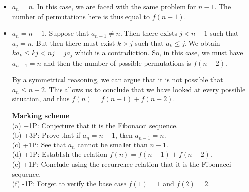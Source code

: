 \begin{itemize}
    \item $a_n = n$. In this case, we are faced with the same problem for $n-1$. The number of permutations here is thus equal to $f(n-1)$.
    \item $a_n = n-1$. Suppose that $a_{n-1} \neq n$. Then there exists $j<n-1$ such that $a_j = n$. But then there must exist $k > j$ such that $a_k \leq j$. We obtain $ka_k \leq kj < nj = ja_j$ which is a contradiction. So, in this case, we must have $a_{n-1} = n$ and then the number of possible permutations is $f(n-2)$.
    
By a symmetrical reasoning, we can argue that it is not possible that $a_n \leq n-2$. This allows us to conclude that we have looked at every possible situation, and thus $f(n) = f(n-1) + f(n-2)$.

\textbf{Marking scheme}\\
(a) +1P: Conjecture that it is the Fibonacci sequence.\\
(b) +3P: Prove that if $a_n = n-1$, then $a_{n-1} = n$.\\
(c) +1P: See that $a_n$ cannot be smaller than $n-1$.\\
(d) +1P: Establish the relation $f(n) = f(n-1) + f(n-2)$.\\
(e) +1P: Conclude using the recurrence relation that it is the Fibonacci sequence.\\
(f) -1P: Forget to verify the base case $f(1) = 1$ and $f(2) = 2$.\\
\end{itemize}
\fi